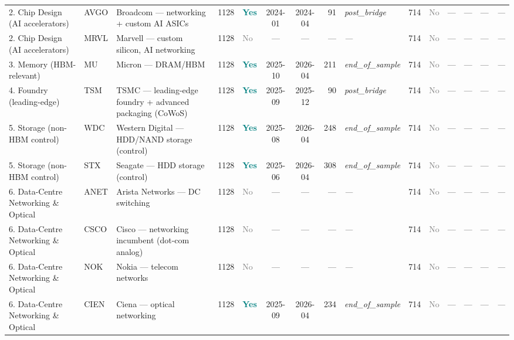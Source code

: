 \begin{table}[htbp]
\begin{tabular}{llp{3cm}r l cc r l  r l cc r l}
2. Chip Design (AI accelerators) & AVGO & Broadcom --- networking + custom AI ASICs & 1128 & \textcolor{teal}{\textbf{Yes}} & 2024-01 & 2024-04 & 91 & \textit{post\_bridge} & 714 & \textcolor{gray}{No} & --- & --- & --- & \textit{---} \\
2. Chip Design (AI accelerators) & MRVL & Marvell --- custom silicon, AI networking & 1128 & \textcolor{gray}{No} & --- & --- & --- & \textit{---} & 714 & \textcolor{gray}{No} & --- & --- & --- & \textit{---} \\
\midrule
3. Memory (HBM-relevant) & MU & Micron --- DRAM/HBM & 1128 & \textcolor{teal}{\textbf{Yes}} & 2025-10 & 2026-04 & 211 & \textit{end\_of\_sample} & 714 & \textcolor{gray}{No} & --- & --- & --- & \textit{---} \\
\midrule
4. Foundry (leading-edge) & TSM & TSMC --- leading-edge foundry + advanced packaging (CoWoS) & 1128 & \textcolor{teal}{\textbf{Yes}} & 2025-09 & 2025-12 & 90 & \textit{post\_bridge} & 714 & \textcolor{gray}{No} & --- & --- & --- & \textit{---} \\
\midrule
5. Storage (non-HBM control) & WDC & Western Digital --- HDD/NAND storage (control) & 1128 & \textcolor{teal}{\textbf{Yes}} & 2025-08 & 2026-04 & 248 & \textit{end\_of\_sample} & 714 & \textcolor{gray}{No} & --- & --- & --- & \textit{---} \\
5. Storage (non-HBM control) & STX & Seagate --- HDD storage (control) & 1128 & \textcolor{teal}{\textbf{Yes}} & 2025-06 & 2026-04 & 308 & \textit{end\_of\_sample} & 714 & \textcolor{gray}{No} & --- & --- & --- & \textit{---} \\
\midrule
6. Data-Centre Networking \& Optical & ANET & Arista Networks --- DC switching & 1128 & \textcolor{gray}{No} & --- & --- & --- & \textit{---} & 714 & \textcolor{gray}{No} & --- & --- & --- & \textit{---} \\
6. Data-Centre Networking \& Optical & CSCO & Cisco --- networking incumbent (dot-com analog) & 1128 & \textcolor{gray}{No} & --- & --- & --- & \textit{---} & 714 & \textcolor{gray}{No} & --- & --- & --- & \textit{---} \\
6. Data-Centre Networking \& Optical & NOK & Nokia --- telecom networks & 1128 & \textcolor{gray}{No} & --- & --- & --- & \textit{---} & 714 & \textcolor{gray}{No} & --- & --- & --- & \textit{---} \\
6. Data-Centre Networking \& Optical & CIEN & Ciena --- optical networking & 1128 & \textcolor{teal}{\textbf{Yes}} & 2025-09 & 2026-04 & 234 & \textit{end\_of\_sample} & 714 & \textcolor{gray}{No} & --- & --- & --- & \textit{---} \\

\end{tabular}
\end{table}
